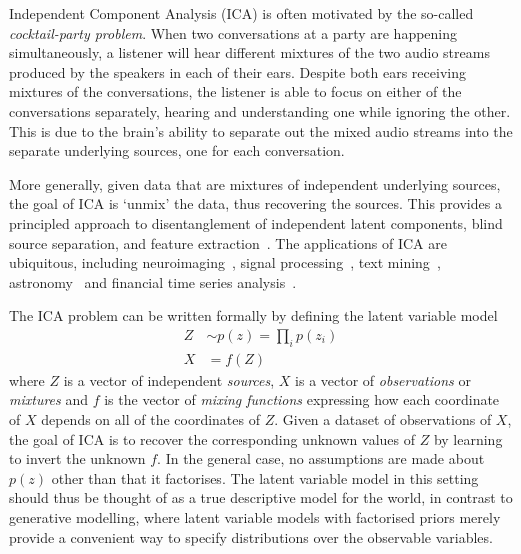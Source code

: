 Independent Component Analysis (ICA) is often motivated by the so-called \emph{cocktail-party problem}.
When two conversations at a party are happening simultaneously, a listener will hear different mixtures of the two audio streams produced by the speakers in each of their ears.
Despite both ears receiving mixtures of the conversations, the listener is able to focus on either of the conversations separately, hearing and understanding one while ignoring the other.
This is due to the brain's ability to separate out the mixed audio streams into the separate underlying sources, one for each conversation.

More generally, given data that are mixtures of independent underlying sources, the goal of ICA is `unmix' the data, thus recovering the sources.
This provides a principled approach to disentanglement of independent latent components, blind source separation, and feature extraction~\citep{hyvarinen2000independent}.
The applications of ICA are ubiquitous, including neuroimaging~\citep{mckeown1998independent}, signal processing~\citep{sawada2003direction}, text mining~\citep{honkela2010wordica}, astronomy~\citep{nuzillard2000blind} and financial time series analysis~\citep{oja2000independent}.

The ICA problem can be written formally by defining the 
latent variable model
%
\begin{align}
Z &\sim p(z) = \prod_i p(z_i) \label{eqn:ica-basic-1} \\
X &= f(Z) \label{eqn:ica-basic-2}
\end{align}
%
where $Z$ is a vector of independent \emph{sources}, $X$ is a vector of \emph{observations} or \emph{mixtures} and $f$ is the vector of \emph{mixing functions} expressing how each coordinate of $X$ depends on all of the coordinates of $Z$. 
Given a dataset of observations of $X$, the goal of ICA is to recover the corresponding unknown values of $Z$ by learning to invert the unknown $f$.
In the general case, no assumptions are made about $p(z)$ other than that it factorises.
The latent variable model in this setting should thus be thought of as a true descriptive model for the world, 
in contrast to generative modelling, where latent variable models with factorised priors merely provide a convenient way to specify distributions over the observable variables. 


